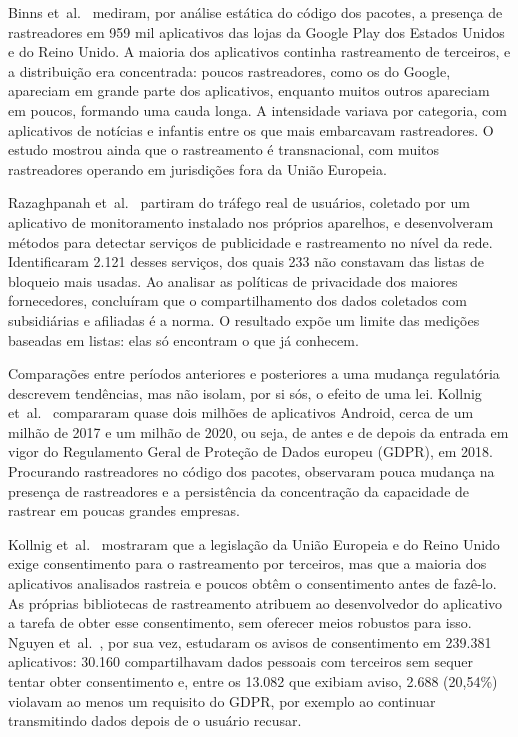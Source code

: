 Binns et~al.~\cite{binns2018} mediram, por análise estática do código dos pacotes, a presença de rastreadores em 959 mil aplicativos das lojas da Google Play dos Estados Unidos e do Reino Unido. A maioria dos aplicativos continha rastreamento de terceiros, e a distribuição era concentrada: poucos rastreadores, como os do Google, apareciam em grande parte dos aplicativos, enquanto muitos outros apareciam em poucos, formando uma cauda longa. A intensidade variava por categoria, com aplicativos de notícias e infantis entre os que mais embarcavam rastreadores. O estudo mostrou ainda que o rastreamento é transnacional, com muitos rastreadores operando em jurisdições fora da União Europeia.

Razaghpanah et~al.~\cite{razaghpanah2018} partiram do tráfego real de usuários, coletado por um aplicativo de monitoramento instalado nos próprios aparelhos, e desenvolveram métodos para detectar serviços de publicidade e rastreamento no nível da rede. Identificaram 2.121 desses serviços, dos quais 233 não constavam das listas de bloqueio mais usadas. Ao analisar as políticas de privacidade dos maiores fornecedores, concluíram que o compartilhamento dos dados coletados com subsidiárias e afiliadas é a norma. O resultado expõe um limite das medições baseadas em listas: elas só encontram o que já conhecem.

Comparações entre períodos anteriores e posteriores a uma mudança regulatória descrevem tendências, mas não isolam, por si sós, o efeito de uma lei. Kollnig et~al.~\cite{kollnig2021before} compararam quase dois milhões de aplicativos Android, cerca de um milhão de 2017 e um milhão de 2020, ou seja, de antes e de depois da entrada em vigor do Regulamento Geral de Proteção de Dados europeu (GDPR), em 2018. Procurando rastreadores no código dos pacotes, observaram pouca mudança na presença de rastreadores e a persistência da concentração da capacidade de rastrear em poucas grandes empresas.

Kollnig et~al.~\cite{kollnig2021fait} mostraram que a legislação da União Europeia e do Reino Unido exige consentimento para o rastreamento por terceiros, mas que a maioria dos aplicativos analisados rastreia e poucos obtêm o consentimento antes de fazê-lo. As próprias bibliotecas de rastreamento atribuem ao desenvolvedor do aplicativo a tarefa de obter esse consentimento, sem oferecer meios robustos para isso. Nguyen et~al.~\cite{nguyen2022}, por sua vez, estudaram os avisos de consentimento em 239.381 aplicativos: 30.160 compartilhavam dados pessoais com terceiros sem sequer tentar obter consentimento e, entre os 13.082 que exibiam aviso, 2.688 (20,54\%) violavam ao menos um requisito do GDPR, por exemplo ao continuar transmitindo dados depois de o usuário recusar.

